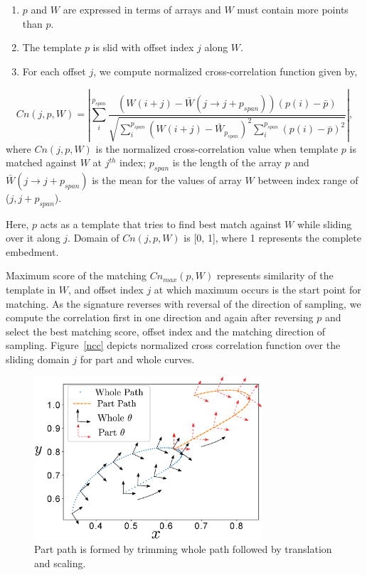 \documentclass[twocolumn,10pt]{asme2ej}
\begin{document}
\begin{enumerate}
  \item $p$ and $W$ are expressed in terms of arrays and $W$ must contain more points than $p$.
  \item The template $p$ is slid with offset index $j$ along $W$.
  \item For each offset $j$, we compute normalized cross-correlation function given by,
\end{enumerate}
\vspace{-0.6cm}
\begin{equation}\label{nccEq}
  Cn(j, p, W) = |\sum_{i}^{p_{span}} \frac{(W(i+j) - \bar{W}(j\to j + p_{span}))(p(i) - \bar{p})}{\sqrt{\sum_{i}^{p_{span}}{(W(i+j) - \bar{W}_{p_{span}})}^2\sum_{i}^{p_{span}}{(p(i) - \bar{p})}^2}} |,
\end{equation}
where $Cn(j, p, W)$ is the normalized cross-correlation value when template $p$ is matched against $W$ at $j^{th}$ index; $p_{span}$ is the length of the array $p$ and $\bar{W}(j\to j + p_{span})$ is the mean for the values of array $W$ between index range of ($j, j+p_{span}$).

Here, $p$ acts as a template that tries to find best match against $W$ while sliding over it along $j$.
Domain of $Cn(j, p, W)$ is [0, 1], where 1 represents the complete embedment.

Maximum score of the matching $Cn_{max}(p, W)$ represents similarity of the template in $W$, and offset index $j$ at which maximum occurs is the start point for matching.
As the signature reverses with reversal of the direction of sampling, we compute the correlation first in one direction and again after reversing $p$ and select the best matching score, offset index and the matching direction of sampling.
Figure~\ref{ncc} depicts normalized cross correlation function over the sliding domain $j$ for part and whole curves.

\begin{figure}
\centering
\includegraphics[width=240pt]{figure/fig_whole_part.eps}
  \caption{Part path is formed by trimming whole path followed by translation and scaling.}
\label{wholePart}
\end{figure}
\end{document}
